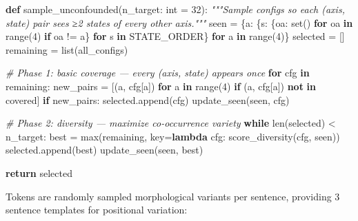 \documentclass[
  twocolumn,
  10pt,
  a4paper]{article}
\newenvironment{Shaded}{}{}
\newcommand{\BuiltInTok}[1]{\textcolor[rgb]{0.00,0.50,0.00}{#1}}
\newcommand{\CommentTok}[1]{\textcolor[rgb]{0.38,0.63,0.69}{\textit{#1}}}
\newcommand{\ControlFlowTok}[1]{\textcolor[rgb]{0.00,0.44,0.13}{\textbf{#1}}}
\newcommand{\DecValTok}[1]{\textcolor[rgb]{0.25,0.63,0.44}{#1}}
\newcommand{\KeywordTok}[1]{\textcolor[rgb]{0.00,0.44,0.13}{\textbf{#1}}}
\newcommand{\NormalTok}[1]{#1}
\newcommand{\OperatorTok}[1]{\textcolor[rgb]{0.40,0.40,0.40}{#1}}
\begin{document}
\begin{Shaded}
\begin{Highlighting}[]
\KeywordTok{def}\NormalTok{ sample\_unconfounded(n\_target: }\BuiltInTok{int} \OperatorTok{=} \DecValTok{32}\NormalTok{):}
    \CommentTok{"""Sample configs so each (axis, state) pair sees ≥2 states}
\CommentTok{    of every other axis."""}
\NormalTok{    seen }\OperatorTok{=}\NormalTok{ \{a: \{s: \{oa: }\BuiltInTok{set}\NormalTok{() }\ControlFlowTok{for}\NormalTok{ oa }\KeywordTok{in} \BuiltInTok{range}\NormalTok{(}\DecValTok{4}\NormalTok{) }\ControlFlowTok{if}\NormalTok{ oa }\OperatorTok{!=}\NormalTok{ a\}}
                \ControlFlowTok{for}\NormalTok{ s }\KeywordTok{in}\NormalTok{ STATE\_ORDER\} }\ControlFlowTok{for}\NormalTok{ a }\KeywordTok{in} \BuiltInTok{range}\NormalTok{(}\DecValTok{4}\NormalTok{)\}}
\NormalTok{    selected }\OperatorTok{=}\NormalTok{ []}
\NormalTok{    remaining }\OperatorTok{=} \BuiltInTok{list}\NormalTok{(all\_configs)}
    
    \CommentTok{\# Phase 1: basic coverage — every (axis, state) appears once}
    \ControlFlowTok{for}\NormalTok{ cfg }\KeywordTok{in}\NormalTok{ remaining:}
\NormalTok{        new\_pairs }\OperatorTok{=}\NormalTok{ [(a, cfg[a]) }\ControlFlowTok{for}\NormalTok{ a }\KeywordTok{in} \BuiltInTok{range}\NormalTok{(}\DecValTok{4}\NormalTok{)}
                     \ControlFlowTok{if}\NormalTok{ (a, cfg[a]) }\KeywordTok{not} \KeywordTok{in}\NormalTok{ covered]}
        \ControlFlowTok{if}\NormalTok{ new\_pairs:}
\NormalTok{            selected.append(cfg)}
\NormalTok{            update\_seen(seen, cfg)}
    
    \CommentTok{\# Phase 2: diversity — maximize co{-}occurrence variety}
    \ControlFlowTok{while} \BuiltInTok{len}\NormalTok{(selected) }\OperatorTok{\textless{}}\NormalTok{ n\_target:}
\NormalTok{        best }\OperatorTok{=} \BuiltInTok{max}\NormalTok{(remaining, key}\OperatorTok{=}\KeywordTok{lambda}\NormalTok{ cfg: score\_diversity(cfg, seen))}
\NormalTok{        selected.append(best)}
\NormalTok{        update\_seen(seen, best)}
    
    \ControlFlowTok{return}\NormalTok{ selected}
\end{Highlighting}
\end{Shaded}

Tokens are randomly sampled morphological variants per sentence,
providing 3 sentence templates for positional variation:
\end{document}
